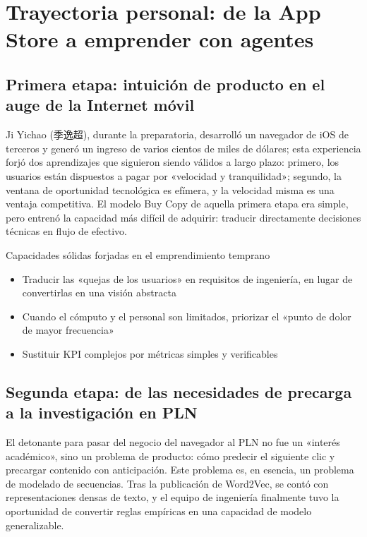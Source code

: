 \section{Trayectoria personal: de la App Store a emprender con agentes}

\subsection{Primera etapa: intuición de producto en el auge de la Internet móvil}

Ji Yichao (季逸超), durante la preparatoria, desarrolló un navegador de iOS de terceros y generó un ingreso de varios cientos de miles de dólares; esta experiencia forjó dos aprendizajes que siguieron siendo válidos a largo plazo: primero, los usuarios están dispuestos a pagar por «velocidad y tranquilidad»; segundo, la ventana de oportunidad tecnológica es efímera, y la velocidad misma es una ventaja competitiva. El modelo Buy Copy de aquella primera etapa era simple, pero entrenó la capacidad más difícil de adquirir: traducir directamente decisiones técnicas en flujo de efectivo.

\begin{importantbox}{Capacidades sólidas forjadas en el emprendimiento temprano}
\begin{itemize}
    \item Traducir las «quejas de los usuarios» en requisitos de ingeniería, en lugar de convertirlas en una visión abstracta
    \item Cuando el cómputo y el personal son limitados, priorizar el «punto de dolor de mayor frecuencia»
    \item Sustituir KPI complejos por métricas simples y verificables
\end{itemize}
\end{importantbox}

\subsection{Segunda etapa: de las necesidades de precarga a la investigación en PLN}

El detonante para pasar del negocio del navegador al PLN no fue un «interés académico», sino un problema de producto: cómo predecir el siguiente clic y precargar contenido con anticipación. Este problema es, en esencia, un problema de modelado de secuencias. Tras la publicación de Word2Vec, se contó con representaciones densas de texto, y el equipo de ingeniería finalmente tuvo la oportunidad de convertir reglas empíricas en una capacidad de modelo generalizable.


